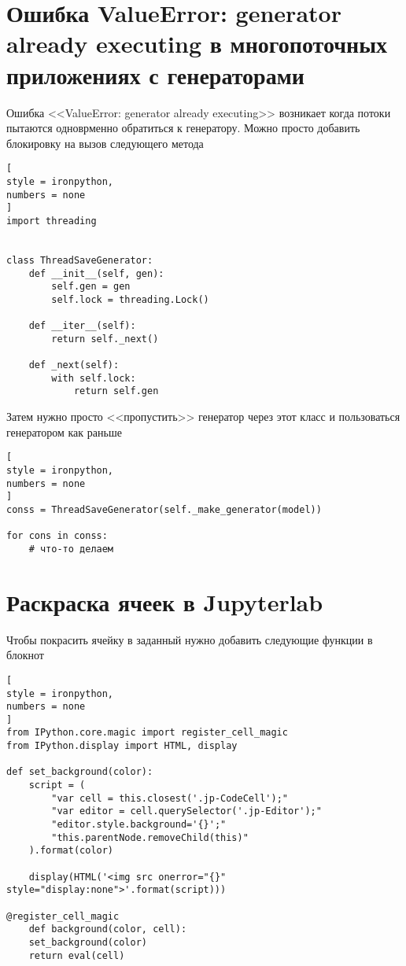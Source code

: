 \documentclass[%
	11pt,
	a4paper,
	utf8,
		]{article}
\begin{document}
\section{Ошибка ValueError: generator already executing в многопоточных приложениях с генераторами}

Ошибка <<ValueError: generator already executing>> возникает когда потоки пытаются одноврменно обратиться к генератору. Можно просто добавить блокировку на вызов следующего метода
\begin{lstlisting}[
style = ironpython,
numbers = none
]
import threading


class ThreadSaveGenerator:
	def __init__(self, gen):
		self.gen = gen
		self.lock = threading.Lock()
	
	def __iter__(self):
		return self._next()
	
	def _next(self):
		with self.lock:
			return self.gen
\end{lstlisting}

Затем нужно просто <<пропустить>> генератор через этот класс и пользоваться генератором как раньше
\begin{lstlisting}[
style = ironpython,
numbers = none
]
conss = ThreadSaveGenerator(self._make_generator(model))

for cons in conss:
    # что-то делаем
\end{lstlisting}



\section{Раскраска ячеек в Jupyterlab}

Чтобы покрасить ячейку в заданный нужно добавить следующие функции в блокнот
\begin{lstlisting}[
style = ironpython,
numbers = none
]
from IPython.core.magic import register_cell_magic
from IPython.display import HTML, display

def set_background(color):    
	script = (
		"var cell = this.closest('.jp-CodeCell');"
		"var editor = cell.querySelector('.jp-Editor');"
		"editor.style.background='{}';"
		"this.parentNode.removeChild(this)"
	).format(color)

	display(HTML('<img src onerror="{}" style="display:none">'.format(script)))

@register_cell_magic
	def background(color, cell):
	set_background(color)
	return eval(cell)
\end{lstlisting}
\end{document}
